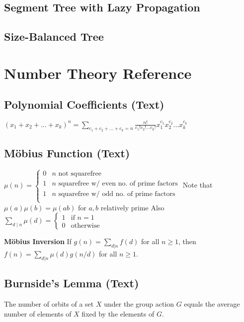 \documentclass[9pt]{extarticle}
\begin{document}
\begin{multicols*}{3}
\subsection{Segment Tree with Lazy Propagation} %


\subsection{Size-Balanced Tree}


\section{Number Theory Reference}
\subsection{Polynomial Coefficients (Text)} %
$(x_1 + x_2 + ... + x_k)^n = \sum_{c_1 + c_2 + ... + c_k = n}
\frac{n!}{c_1! c_2! ... c_k!} x_1^{c_1} x_2^{c_2} ... x_k^{c_k}$

\subsection{M\"obius Function (Text)} %
$\mu(n) = \begin{cases}
0 & \text{$n$ not squarefree} \\
1 & \text{$n$ squarefree w/ even no. of prime factors} \\
1 & \text{$n$ squarefree w/ odd no. of prime factors} \\
\end{cases}$
Note that $\mu(a) \mu(b) = \mu(ab)$ for $a, b$ relatively prime
Also $\sum_{d \mid n} \mu(d) = \begin{cases} 1 & \text{if $n = 1$} \\
0 & \text{otherwise} \end{cases}$

\textbf{M\"obius Inversion}
If $g(n) = \sum_{d|n} f(d)$ for all $n \ge 1$, then
$f(n) = \sum_{d|n} \mu(d)g(n/d)$ for all $n \ge 1$.

\subsection{Burnside's Lemma (Text)} %
The number of orbits of a set $X$ under the group action $G$ equals the average
number of elements of $X$ fixed by the elements of $G$.


\end{multicols*}
\end{document}
